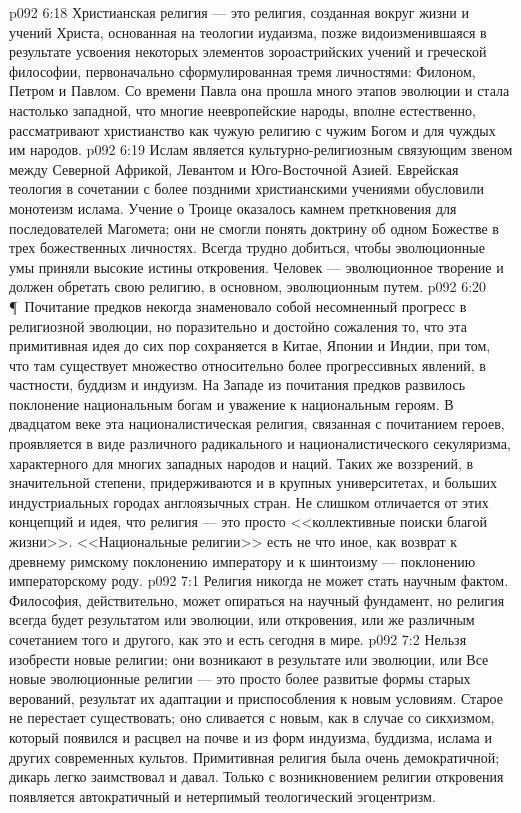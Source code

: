 \vs p092 6:18 Христианская религия --- это религия, созданная вокруг жизни и учений Христа, основанная на теологии иудаизма, позже видоизменившаяся в результате усвоения некоторых элементов зороастрийских учений и греческой философии, первоначально сформулированная тремя личностями: Филоном, Петром и Павлом. Со времени Павла она прошла много этапов эволюции и стала настолько западной, что многие неевропейские народы, вполне естественно, рассматривают христианство как чужую религию с чужим Богом и для чуждых им народов.
\vs p092 6:19 Ислам является культурно\hyp{}религиозным связующим звеном между Северной Африкой, Левантом и Юго\hyp{}Восточной Азией. Еврейская теология в сочетании с более поздними христианскими учениями обусловили монотеизм ислама. Учение о Троице оказалось камнем преткновения для последователей Магомета; они не смогли понять доктрину об одном Божестве в трех божественных личностях. Всегда трудно добиться, чтобы эволюционные умы  приняли высокие истины откровения. Человек --- эволюционное творение и должен обретать свою религию, в основном, эволюционным путем.
\vs p092 6:20 \P\ Почитание предков некогда знаменовало собой несомненный прогресс в религиозной эволюции, но поразительно и достойно сожаления то, что эта примитивная идея до сих пор сохраняется в Китае, Японии и Индии, при том, что там существует множество относительно более прогрессивных явлений, в частности, буддизм и индуизм. На Западе из почитания предков развилось поклонение национальным богам и уважение к национальным героям. В двадцатом веке эта националистическая религия, связанная с почитанием героев, проявляется в виде различного радикального и националистического секуляризма, характерного для многих западных народов и наций. Таких же воззрений, в значительной степени, придерживаются и в крупных университетах, и больших индустриальных городах англоязычных стран. Не слишком отличается от этих концепций и идея, что религия --- это просто <<коллективные поиски благой жизни>>. <<Национальные религии>> есть не что иное, как возврат к древнему римскому поклонению императору и к шинтоизму --- поклонению императорскому роду.
\vs p092 7:1 Религия никогда не может стать научным фактом. Философия, действительно, может опираться на научный фундамент, но религия всегда будет результатом или эволюции, или откровения, или же различным сочетанием того и другого, как это и есть сегодня в мире.
\vs p092 7:2 Нельзя изобрести новые религии; они возникают в результате или эволюции, или  Все новые эволюционные религии --- это просто более развитые формы старых верований, результат их адаптации и приспособления к новым условиям. Старое не перестает существовать; оно сливается с новым, как в случае со сикхизмом, который появился и расцвел на почве и из форм индуизма, буддизма, ислама и других современных культов. Примитивная религия была очень демократичной; дикарь легко заимствовал и давал. Только с возникновением религии откровения появляется автократичный и нетерпимый теологический эгоцентризм.
